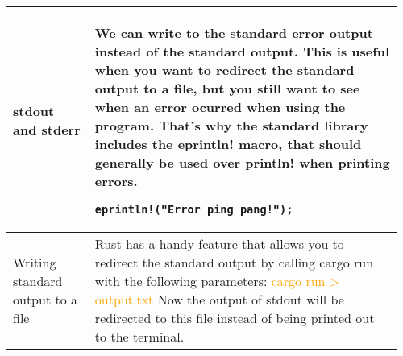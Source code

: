 \documentclass[main.tex,fontsize=8pt,paper=a4,paper=portrait,DIV=calc,]{scrartcl}
\begin{document}
\begin{table}[ht!]
\begin{tabular}{|m{0.2\linewidth}|m{0.755\linewidth}|}
\hline
stdout and stderr & 
We can write to the standard error output instead of the standard output. \newline
This is useful when you want to redirect the standard output to a file, but you still want to see when an error ocurred when using the program.\newline
That's why the standard library includes the \textbf{eprintln!} macro, that should generally be used over println! when printing errors.\newline
\begin{lstlisting}
eprintln!("Error ping pang!");
\end{lstlisting}\\
\hline
Writing standard output to a file & 
Rust has a handy feature that allows you to redirect the standard output by calling cargo run with the following parameters: \newline
\textcolor{orange}{cargo run > output.txt}\newline
Now the output of stdout will be redirected to this file instead of being printed out to the terminal.\\
\hline
\end{tabular}
\end{table}
\pagebreak
\end{document}
